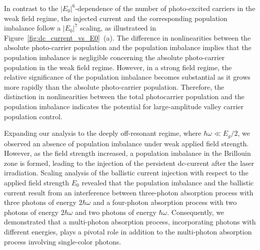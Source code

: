 In contrast to the $|E_0|^6$-dependence of the number of photo-excited carriers in the weak field regime, the injected current and the corresponding population imbalance follow a $|E_0|^7$ scaling, as illustrateed in Figure~\ref{fig:dc_current_vs_E0}~(a). The difference in nonlinearities between the absolute photo-carrier population and the population imbalance implies that the population imbalance is negligible concerning the absolute photo-carrier population in the weak field regime. However, in a strong field regime, the relative significance of the population imbalance becomes substantial as it grows more rapidly than the absolute photo-carrier population. Therefore, the distinction in nonlinearities between the total photocarrier population and the population imbalance indicates the potential for large-amplitude valley carrier population control.

Expanding our analysis to the deeply off-resonant regime, where $\hbar \omega \ll E_g/2$, we observed an absence of population imbalance under weak applied field strength. However, as the field strength increased, a population imbalance in the Brillouin zone is formed, leading to the injection of the persistent dc-current after the laser irradiation. Scaling analysis of the ballistic current injection with respect to the applied field strength $E_0$ revealed that the population imbalance and the ballistic current result from an interference between three-photon absorption process with three photons of energy $2\hbar \omega$ and a four-photon absorption process with two photons of energy $2\hbar \omega$ and two photons of energy $\hbar \omega$. Consequently, we demonstrated that a multi-photon absorption process, incorporating photons with different energies, plays a pivotal role in addition to the multi-photon absorption process involving single-color photons.


